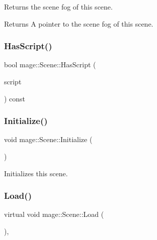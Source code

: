 Returns the scene fog of this scene.

\begin{DoxyReturn}{Returns}
A pointer to the scene fog of this scene. 
\end{DoxyReturn}
\hypertarget{classmage_1_1_scene_a9dd6c49e9db7590de1de4fbd128c78a9}{}\label{classmage_1_1_scene_a9dd6c49e9db7590de1de4fbd128c78a9} 
\subsubsection{\texorpdfstring{Has\+Script()}{HasScript()}}
{\footnotesize\ttfamily bool mage\+::\+Scene\+::\+Has\+Script (\begin{DoxyParamCaption}\item[{\hyperlink{namespacemage_a1e01ae66713838a7a67d30e44c67703e}{Shared\+Ptr}$<$ const \hyperlink{classmage_1_1_behavior_script}{Behavior\+Script} $>$}]{script }\end{DoxyParamCaption}) const}

\hypertarget{classmage_1_1_scene_a3cd12ef381ca743bf0b8f8aa2a76eb57}{}\label{classmage_1_1_scene_a3cd12ef381ca743bf0b8f8aa2a76eb57} 
\subsubsection{\texorpdfstring{Initialize()}{Initialize()}}
{\footnotesize\ttfamily void mage\+::\+Scene\+::\+Initialize (\begin{DoxyParamCaption}{ }\end{DoxyParamCaption})}

Initializes this scene. \hypertarget{classmage_1_1_scene_a1fb4a93eaa2f6a9e20594e205abb9a32}{}\label{classmage_1_1_scene_a1fb4a93eaa2f6a9e20594e205abb9a32} 
\subsubsection{\texorpdfstring{Load()}{Load()}}
{\footnotesize\ttfamily virtual void mage\+::\+Scene\+::\+Load (\begin{DoxyParamCaption}{ }\end{DoxyParamCaption})\hspace{0.3cm}{\ttfamily [private]}, {\ttfamily [virtual]}}

